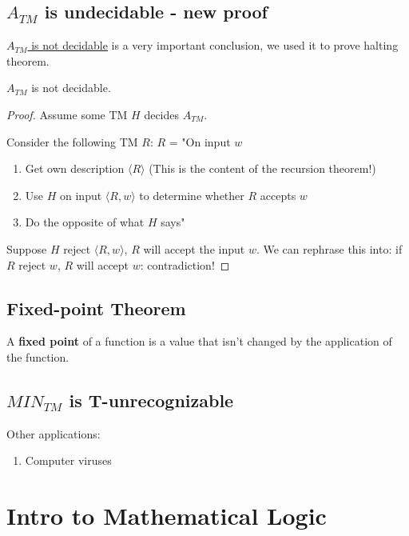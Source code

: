\subsection{\(A_{TM}\) is undecidable - new proof}
\hyperref[theorem: A(TM) not decidable]{\(A_{TM}\) is not decidable} is a very important conclusion, we used it to prove halting theorem.

\begin{theorem}
    \(A_{TM}\) is not decidable. 
\end{theorem}
\begin{proof}
    Assume some TM \(H\) decides \(A_{TM}\). 

    Consider the following TM \(R\):
    \(R\) = "On input \(w\)
    \begin{enumerate}
        \item Get own description \(\langle R \rangle\) (This is the content of the recursion theorem!)
        \item Use \(H\) on input \(\langle R, w \rangle\)  to determine whether \(R\) accepts \(w\)
        \item Do the opposite of what \(H\) says"
    \end{enumerate}   

    Suppose \(H\) reject \(\langle R, w \rangle\), \(R\) will accept the input \(w\). 
    We can rephrase this into: if \(R\) reject \(w\), \(R\) will accept \(w\): contradiction!     
\end{proof}
    

\subsection{Fixed-point Theorem}
    A \textbf{fixed point} of a function is a value that isn't changed by the application of the function.  
\subsection{\(MIN_{TM}\) is T-unrecognizable}

Other applications:
\begin{enumerate}
    \item Computer viruses
\end{enumerate}

\section{Intro to Mathematical Logic}
\begin{definition}[Goal]
    
\end{definition}


\begin{example}
    
\end{example}

